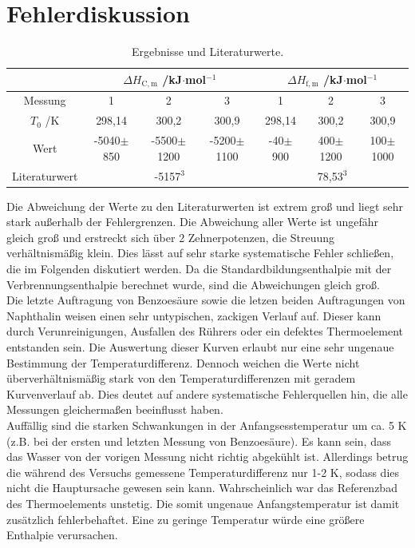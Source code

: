 \documentclass[12pt,a4paper,titlepage,headinclude,bibtotoc]{scrartcl}
\begin{document}
\section{Fehlerdiskussion}

\begin{table}[ht!]\centering  \caption{Ergebnisse und Literaturwerte.}
\begin{tabular}{c|c|c|c|c|c|c}
 &\multicolumn{3}{c|}{$\Delta H_\mathrm{C,m}$ /kJ$\cdot$mol$^{-1}$}& \multicolumn{3}{c}{$\Delta H_\mathrm{f,m}$ /kJ$\cdot$mol$^{-1}$}\\ 
\hline 
Messung & 1 & 2 & 3 & 1 & 2 & 3 \\
$T_0$ /K&298,14&300,2&300,9&298,14&300,2&300,9\\
Wert &-5040$\pm$850&-5500$\pm$1200&-5200$\pm$1100&-40$\pm$900&400$\pm$1200&100$\pm$1000\\
\hline
Literaturwert&\multicolumn{3}{c|}{-5157$^3$}&\multicolumn{3}{c}{78,53$^3$}\\
\end{tabular} 
\end{table}








Die Abweichung der Werte zu den Literaturwerten ist extrem groß und liegt sehr stark außerhalb der Fehlergrenzen. Die Abweichung aller Werte ist ungefähr gleich groß und erstreckt sich über 2 Zehnerpotenzen, die Streuung verhältnismäßig klein. Dies lässt auf sehr starke systematische Fehler schließen, die im Folgenden diskutiert werden.
Da die Standardbildungsenthalpie mit der Verbrennungsenthalpie berechnet wurde, sind die Abweichungen gleich groß. \\

Die letzte Auftragung von Benzoesäure sowie die letzen beiden Auftragungen von Naphthalin weisen einen sehr untypischen, zackigen Verlauf auf. Dieser kann durch Verunreinigungen, Ausfallen des Rührers oder ein defektes Thermoelement entstanden sein. Die Auswertung dieser Kurven erlaubt nur eine sehr ungenaue Bestimmung der  Temperaturdifferenz. Dennoch weichen die Werte nicht überverhältnismäßig stark von den Temperaturdifferenzen mit geradem Kurvenverlauf ab. Dies deutet auf andere systematische Fehlerquellen hin, die alle Messungen gleichermaßen beeinflusst haben.\\

Auffällig sind die starken Schwankungen in der Anfangsesstemperatur um ca. 5 K (z.B. bei der ersten und letzten Messung von Benzoesäure). Es kann sein, dass das Wasser von der vorigen Messung nicht richtig abgekühlt ist. Allerdings betrug die während des Versuchs gemessene Temperaturdifferenz nur 1-2 K, sodass dies nicht die Hauptursache gewesen sein kann. Wahrscheinlich war das Referenzbad des Thermoelements unstetig. Die somit ungenaue Anfangstemperatur ist damit zusätzlich fehlerbehaftet. Eine zu geringe Temperatur würde eine größere Enthalpie verursachen.\\
\end{document}
